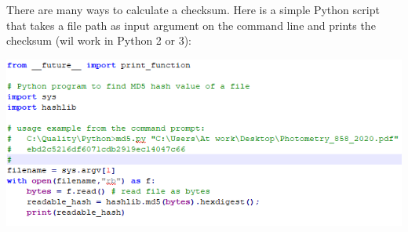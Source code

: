 There are many ways to calculate a checksum. Here is a simple Python script that takes a file path as input argument on the command line and prints the checksum (wil work in Python 2 or 3):

\begin{center}
\includegraphics[scale=.8]{pictures/md5_python}
\end{center}

